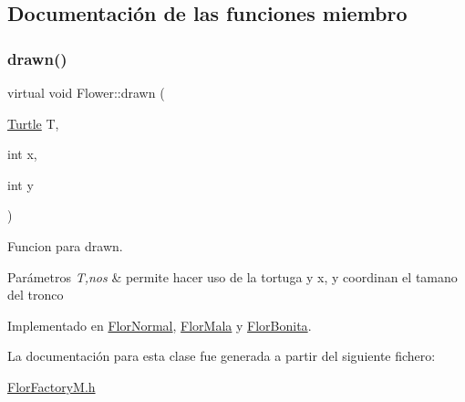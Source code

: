 \subsection{Documentación de las funciones miembro}
\mbox{\label{classFlower_af01eea570f9d02e16cda1d86ee97633c}} 
\subsubsection{\texorpdfstring{drawn()}{drawn()}}
{\footnotesize\ttfamily virtual void Flower\+::drawn (\begin{DoxyParamCaption}\item[{\hyperlink{classTurtle}{Turtle}}]{T,  }\item[{int}]{x,  }\item[{int}]{y }\end{DoxyParamCaption})\hspace{0.3cm}{\ttfamily [pure virtual]}}

Funcion para drawn. 
\begin{DoxyParams}{Parámetros}
{\em T,nos} & permite hacer uso de la tortuga y x, y coordinan el tamano del tronco \\
\hline
\end{DoxyParams}


Implementado en \hyperlink{classFlorNormal_a2e8ae341ef8bea1459baa12966eb1cd2}{Flor\+Normal}, \hyperlink{classFlorMala_aee0f20f3aa80d9ce3cb9c6fdbf036a7c}{Flor\+Mala} y \hyperlink{classFlorBonita_a028f32ccf00bb677f54349afa49657e4}{Flor\+Bonita}.



La documentación para esta clase fue generada a partir del siguiente fichero\+:\begin{DoxyCompactItemize}
\item 
\hyperlink{FlorFactoryM_8h}{Flor\+Factory\+M.\+h}\end{DoxyCompactItemize}

